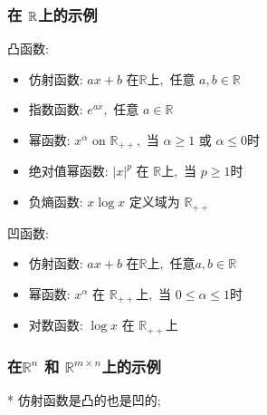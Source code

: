 \documentclass[handout,10pt]{beamer}
\begin{document}
\begin{frame}
	\frametitle{在 $\mathbb{R}$上的示例}
	凸函数:
	\begin{itemize}
		\item 仿射函数: $a x+b$ 在$\mathbb{R}上,$ 任意 $a, b \in \mathbb{R}$
		\item 指数函数: $e^{a x},$ 任意 $a \in \mathbb{R}$
		\item 幂函数: $x^{\alpha}$ on $\mathbb{R}_{++},$ 当 $\alpha \geq 1$ 或 $\alpha \leq 0$时
		\item 绝对值幂函数: $|x|^{p}$ 在 $\mathbb{R}上,$ 当 $p \geq 1$时
		\item 负熵函数: $x \log x$ 定义域为 $\mathbb{R}_{++}$

	\end{itemize}
    \bigskip
    \bigskip
    凹函数:
    \begin{itemize}
    	\item 仿射函数: $a x+b$ 在$\mathbb{R}上,$ 任意$a, b \in \mathbb{R}$
    	\item 幂函数: $x^{\alpha}$ 在 $\mathbb{R}_{++}上,$ 当 $0 \leq \alpha \leq 1$时
    	\item 对数函数: $\log x$ 在 $\mathbb{R}_{++}$上
    \end{itemize}
\end{frame}
\begin{frame}
\frametitle{在$\mathbb{R}^n$ 和 $\mathbb{R}^{m\times n}$上的示例}

	* 仿射函数是凸的也是凹的;




\end{frame}
\end{document}
